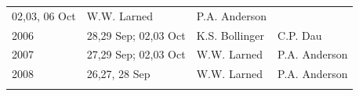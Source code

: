 \documentclass[]{article}
\begin{document}
\begin{longtable}[]{@{}llll@{}}
\begin{minipage}[t]{0.38\columnwidth}
02,03, 06 Oct\strut
\end{minipage} & \begin{minipage}[t]{0.18\columnwidth}\raggedright\strut
W.W. Larned\strut
\end{minipage} & \begin{minipage}[t]{0.20\columnwidth}\raggedright\strut
P.A. Anderson\strut
\end{minipage}\tabularnewline
\begin{minipage}[t]{0.12\columnwidth}\raggedright\strut
2006\strut
\end{minipage} & \begin{minipage}[t]{0.38\columnwidth}\raggedright\strut
28,29 Sep; 02,03 Oct\strut
\end{minipage} & \begin{minipage}[t]{0.18\columnwidth}\raggedright\strut
K.S. Bollinger\strut
\end{minipage} & \begin{minipage}[t]{0.20\columnwidth}\raggedright\strut
C.P. Dau\strut
\end{minipage}\tabularnewline
\begin{minipage}[t]{0.12\columnwidth}\raggedright\strut
2007\strut
\end{minipage} & \begin{minipage}[t]{0.38\columnwidth}\raggedright\strut
27,29 Sep; 02,03 Oct\strut
\end{minipage} & \begin{minipage}[t]{0.18\columnwidth}\raggedright\strut
W.W. Larned\strut
\end{minipage} & \begin{minipage}[t]{0.20\columnwidth}\raggedright\strut
P.A. Anderson\strut
\end{minipage}\tabularnewline
\begin{minipage}[t]{0.12\columnwidth}\raggedright\strut
2008\strut
\end{minipage} & \begin{minipage}[t]{0.38\columnwidth}\raggedright\strut
26,27, 28 Sep\strut
\end{minipage} & \begin{minipage}[t]{0.18\columnwidth}\raggedright\strut
W.W. Larned\strut
\end{minipage} & \begin{minipage}[t]{0.20\columnwidth}\raggedright\strut
P.A. Anderson\strut
\end{minipage}\tabularnewline
\begin{minipage}[t]{0.12\columnwidth}\raggedright\strut

\end{minipage}
\end{longtable}
\end{document}

